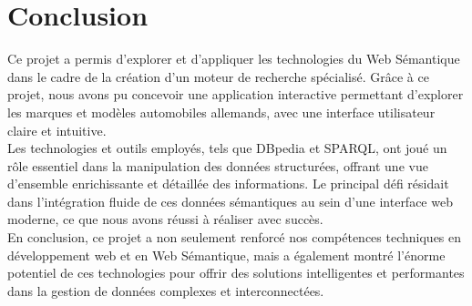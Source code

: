 \documentclass[a4paper]{article}
\begin{document}
\section{Conclusion}
Ce projet a permis d'explorer et d'appliquer les technologies du Web Sémantique dans le cadre de la création d'un moteur de recherche spécialisé. Grâce à ce projet, nous avons pu concevoir une application interactive permettant d'explorer les marques et modèles automobiles allemands, avec une interface utilisateur claire et intuitive. \\

Les technologies et outils employés, tels que DBpedia et SPARQL, ont joué un rôle essentiel dans la manipulation des données structurées, offrant une vue d'ensemble enrichissante et détaillée des informations. Le principal défi résidait dans l'intégration fluide de ces données sémantiques au sein d'une interface web moderne, ce que nous avons réussi à réaliser avec succès. \\

En conclusion, ce projet a non seulement renforcé nos compétences techniques en développement web et en Web Sémantique, mais a également montré l'énorme potentiel de ces technologies pour offrir des solutions intelligentes et performantes dans la gestion de données complexes et interconnectées.
\end{document}
